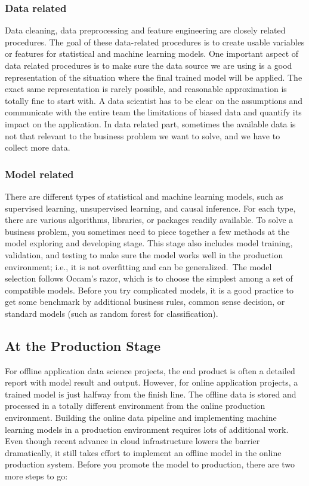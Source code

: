 \documentclass[12pt,]{krantz}
\theoremstyle{definition}
\theoremstyle{definition}
\theoremstyle{definition}
\theoremstyle{remark}
\begin{document}
\subsubsection{Data related}\label{data-related}

Data cleaning, data preprocessing and feature engineering are closely
related procedures. The goal of these data-related procedures is to
create usable variables or features for statistical and machine learning
models. One important aspect of data related procedures is to make sure
the data source we are using is a good representation of the situation
where the final trained model will be applied. The exact same
representation is rarely possible, and reasonable approximation is
totally fine to start with. A data scientist has to be clear on the
assumptions and communicate with the entire team the limitations of
biased data and quantify its impact on the application. In data related
part, sometimes the available data is not that relevant to the business
problem we want to solve, and we have to collect more data.

\subsubsection{Model related}\label{model-related}

There are different types of statistical and machine learning models,
such as supervised learning, unsupervised learning, and causal
inference. For each type, there are various algorithms, libraries, or
packages readily available. To solve a business problem, you sometimes
need to piece together a few methods at the model exploring and
developing stage. This stage also includes model training, validation,
and testing to make sure the model works well in the production
environment; i.e., it is not overfitting and can be generalized.~The
model selection follows Occam's razor, which is to choose the simplest
among a set of compatible models. Before you try complicated models, it
is a good practice to get some benchmark by additional business rules,
common sense decision, or standard models (such as random forest for
classification).

\subsection{At the Production Stage}\label{at-the-production-stage}

For offline application data science projects, the end product is often
a detailed report with model result and output. However, for online
application projects, a trained model is just halfway from the finish
line. The offline data is stored and processed in a totally different
environment from the online production environment. Building the online
data pipeline and implementing machine learning models in a production
environment requires lots of additional work. Even though recent advance
in cloud infrastructure lowers the barrier dramatically, it still takes
effort to implement an offline model in the online production system.
Before you promote the model to production, there are two more steps to
go:
\end{document}
